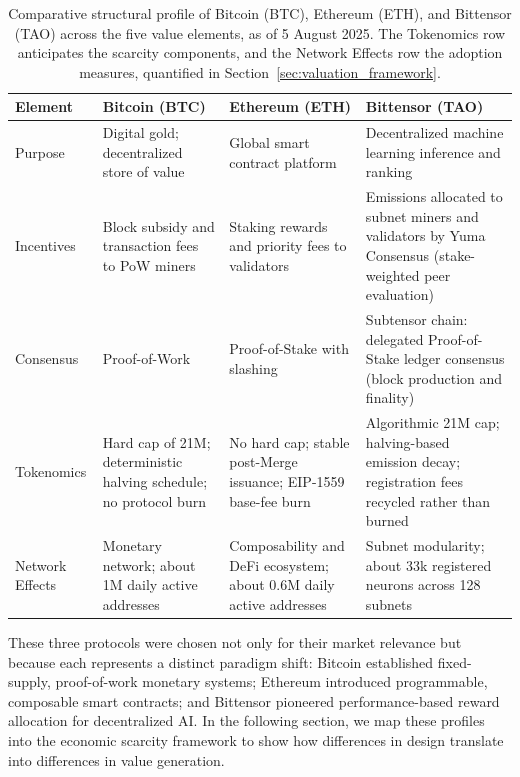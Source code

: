 \documentclass[12pt]{article}
\begin{document}
\begin{table}[H]
\centering
\caption{Comparative structural profile of Bitcoin (BTC), Ethereum (ETH), and Bittensor (TAO) across the five value elements, as of 5 August 2025. The Tokenomics row anticipates the scarcity components, and the Network Effects row the adoption measures, quantified in Section~\ref{sec:valuation_framework}.}
\label{tab:case_study_elements}
\renewcommand{\arraystretch}{1.4}
\begin{tabular}{@{}L{3.5cm}L{4.1cm}L{4.1cm}L{4.1cm}@{}}
\toprule
{}
Element & Bitcoin (BTC) & Ethereum (ETH) & Bittensor (TAO) \\
\midrule
Purpose & Digital gold; decentralized store of value \citep{nakamoto2008bitcoin, huberman2021monetizing} & Global smart contract platform \citep{buterin2022proof, cong2021tokenomics} & Decentralized machine learning inference and ranking \citep{rao2023bittensor} \\
Incentives & Block subsidy and transaction fees to PoW miners \citep{nakamoto2008bitcoin} & Staking rewards and priority fees to validators \citep{buterin2022proof} & Emissions allocated to subnet miners and validators by Yuma Consensus (stake-weighted peer evaluation) \citep{rao2023bittensor} \\
Consensus & Proof-of-Work \citep{nakamoto2008bitcoin} & Proof-of-Stake with slashing \citep{buterin2022proof} & Subtensor chain: delegated Proof-of-Stake ledger consensus (block production and finality) \citep{rao2020bittensor} \\
Tokenomics & Hard cap of 21M; deterministic halving schedule; no protocol burn \citep{nakamoto2008bitcoin} & No hard cap; stable post-Merge issuance; EIP-1559 base-fee burn \citep{buterin2022proof} & Algorithmic 21M cap; halving-based emission decay; registration fees recycled rather than burned \citep{rao2023bittensor} \\
Network Effects & Monetary network; about 1M daily active addresses \citep{glassnodeBTC} & Composability and DeFi ecosystem; about 0.6M daily active addresses \citep{glassnodeETH} & Subnet modularity; about 33k registered neurons across 128 subnets \citep{taostats_accounts} \\
\bottomrule
\end{tabular}
\end{table}

These three protocols were chosen not only for their market relevance but because each represents a distinct paradigm shift: Bitcoin established fixed-supply, proof-of-work monetary systems; Ethereum introduced programmable, composable smart contracts; and Bittensor pioneered performance-based reward allocation for decentralized AI. In the following section, we map these profiles into the economic scarcity framework to show how differences in design translate into differences in value generation.
\end{document}
